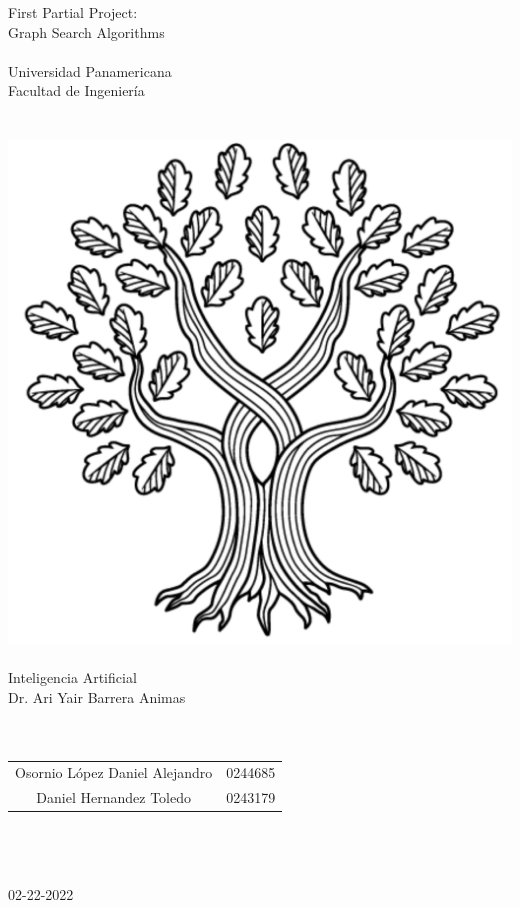 
\hspace{0pt}
\vfill


\begin{center}
    {\huge First Partial Project:\\Graph Search Algorithms}\\    \quad\\
    {\large Universidad Panamericana}\\
    {\large Facultad de Ingeniería}\\
    \quad\\
    \quad\\
    \includegraphics[scale=0.3]{../img/UP}
    \quad\\
    \quad\\
    Inteligencia Artificial\\
    Dr. Ari Yair Barrera Animas\\
    \quad\\
    \quad\\
    \begin{tabular}{c|c}
        Osornio López Daniel Alejandro & 0244685\\
        Daniel Hernandez Toledo & 0243179\\
    \end{tabular}\\
    \quad\\
    \quad\\
    02-22-2022
\end{center}

